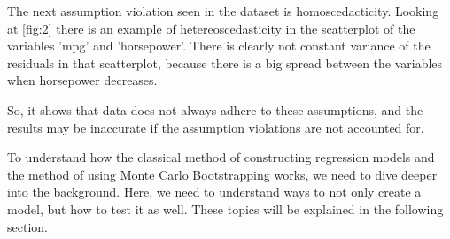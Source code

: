 \noindent The next assumption violation seen in the dataset is homoscedacticity. Looking at \autoref{fig:2} there is an example of hetereoscedasticity in the scatterplot of the variables 'mpg' and 'horsepower'. There is clearly not constant variance of the residuals in that scatterplot, because there is a big spread between the variables when horsepower decreases. \newline

\noindent So, it shows that data does not always adhere to these assumptions, and the results may be inaccurate if the assumption violations are not accounted for. \newline


\noindent To understand how the classical method of constructing regression models and the method of using Monte Carlo Bootstrapping works, we need to dive deeper into the background. Here, we need to understand ways to not only create a model, but how to test it as well. These topics will be explained in the following section.

